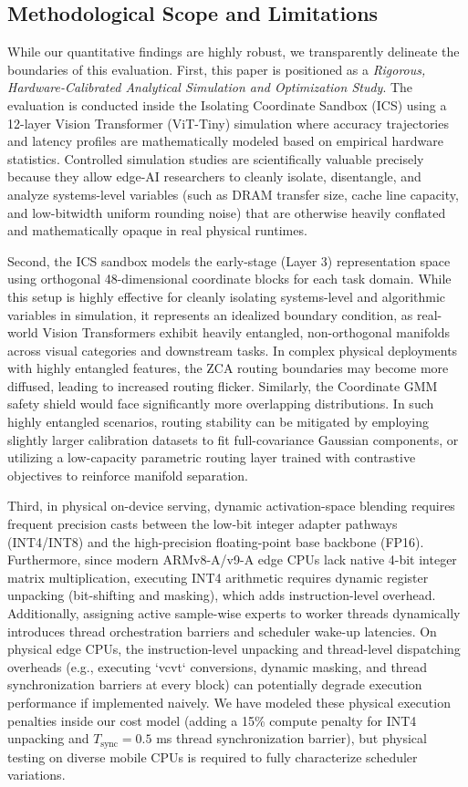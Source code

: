 \subsection{Methodological Scope and Limitations}
While our quantitative findings are highly robust, we transparently delineate the boundaries of this evaluation. First, this paper is positioned as a \textit{Rigorous, Hardware-Calibrated Analytical Simulation and Optimization Study}. The evaluation is conducted inside the Isolating Coordinate Sandbox (ICS) using a 12-layer Vision Transformer (ViT-Tiny) simulation where accuracy trajectories and latency profiles are mathematically modeled based on empirical hardware statistics. Controlled simulation studies are scientifically valuable precisely because they allow edge-AI researchers to cleanly isolate, disentangle, and analyze systems-level variables (such as DRAM transfer size, cache line capacity, and low-bitwidth uniform rounding noise) that are otherwise heavily conflated and mathematically opaque in real physical runtimes. 

Second, the ICS sandbox models the early-stage (Layer 3) representation space using orthogonal 48-dimensional coordinate blocks for each task domain. While this setup is highly effective for cleanly isolating systems-level and algorithmic variables in simulation, it represents an idealized boundary condition, as real-world Vision Transformers exhibit heavily entangled, non-orthogonal manifolds across visual categories and downstream tasks. In complex physical deployments with highly entangled features, the ZCA routing boundaries may become more diffused, leading to increased routing flicker. Similarly, the Coordinate GMM safety shield would face significantly more overlapping distributions. In such highly entangled scenarios, routing stability can be mitigated by employing slightly larger calibration datasets to fit full-covariance Gaussian components, or utilizing a low-capacity parametric routing layer trained with contrastive objectives to reinforce manifold separation.

Third, in physical on-device serving, dynamic activation-space blending requires frequent precision casts between the low-bit integer adapter pathways (INT4/INT8) and the high-precision floating-point base backbone (FP16). Furthermore, since modern ARMv8-A/v9-A edge CPUs lack native 4-bit integer matrix multiplication, executing INT4 arithmetic requires dynamic register unpacking (bit-shifting and masking), which adds instruction-level overhead. Additionally, assigning active sample-wise experts to worker threads dynamically introduces thread orchestration barriers and scheduler wake-up latencies. On physical edge CPUs, the instruction-level unpacking and thread-level dispatching overheads (e.g., executing `vcvt` conversions, dynamic masking, and thread synchronization barriers at every block) can potentially degrade execution performance if implemented naively. We have modeled these physical execution penalties inside our cost model (adding a 15\% compute penalty for INT4 unpacking and $T_{\text{sync}} = 0.5$ ms thread synchronization barrier), but physical testing on diverse mobile CPUs is required to fully characterize scheduler variations.

